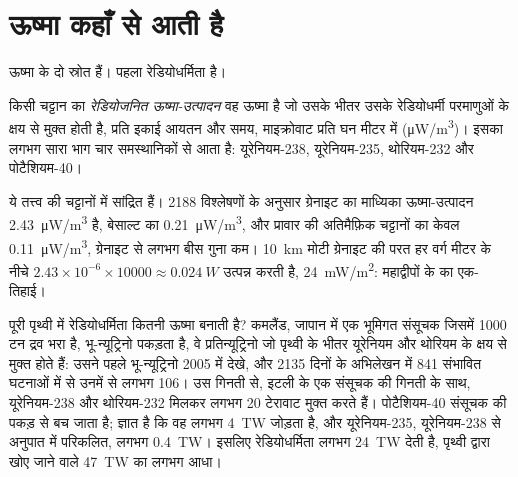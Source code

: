 \section{ऊष्मा कहाँ से आती है}

ऊष्मा के दो स्रोत हैं। पहला रेडियोधर्मिता है।

\begin{definition}[रेडियोजनित ऊष्मा-उत्पादन]\label{def:g12:internal-heat:heat-production}
किसी चट्टान का \emph{रेडियोजनित ऊष्मा-उत्पादन}
वह ऊष्मा है जो उसके भीतर उसके रेडियोधर्मी परमाणुओं के क्षय से मुक्त होती है,
प्रति इकाई आयतन और समय, माइक्रोवाट प्रति घन मीटर में
(\unit{\micro W/m^3})। इसका लगभग सारा भाग चार समस्थानिकों से आता है: यूरेनियम-238,
यूरेनियम-235, थोरियम-232 और पोटैशियम-40।
\end{definition}

ये तत्त्व  की चट्टानों में सांद्रित हैं।
2188 विश्लेषणों के अनुसार ग्रेनाइट का माध्यिका ऊष्मा-उत्पादन
\qty{2.43}{\micro W/m^3} है, बेसाल्ट का \qty{0.21}{\micro W/m^3}, और
प्रावार की अतिमैफ़िक चट्टानों का केवल \qty{0.11}{\micro W/m^3}, ग्रेनाइट से लगभग बीस
गुना कम। \qty{10}{km} मोटी ग्रेनाइट की परत हर वर्ग मीटर के नीचे
$2.43 \times 10^{-6} \times \num{10000} \approx \qty{0.024}{W}$ उत्पन्न करती है,
\qty{24}{mW/m^2}: महाद्वीपों के  का एक-तिहाई।

पूरी पृथ्वी में रेडियोधर्मिता कितनी ऊष्मा बनाती है? कमलैंड, जापान में एक
भूमिगत संसूचक जिसमें 1000 टन द्रव भरा है, भू-न्यूट्रिनो पकड़ता है,
वे प्रतिन्यूट्रिनो जो पृथ्वी के भीतर यूरेनियम और थोरियम के क्षय से मुक्त होते हैं:
उसने पहले भू-न्यूट्रिनो 2005 में देखे, और 2135 दिनों के
अभिलेखन में 841 संभावित घटनाओं में से उनमें से लगभग 106। उस गिनती से,
इटली के एक संसूचक की गिनती के साथ, यूरेनियम-238 और थोरियम-232 मिलकर
लगभग 20 टेरावाट मुक्त करते हैं। पोटैशियम-40 संसूचक की पकड़ से बच जाता है; ज्ञात है कि वह
लगभग \qty{4}{TW} जोड़ता है, और यूरेनियम-235, यूरेनियम-238 से अनुपात में परिकलित, लगभग
\qty{0.4}{TW}। इसलिए रेडियोधर्मिता लगभग \qty{24}{TW} देती है,
पृथ्वी द्वारा खोए जाने वाले \qty{47}{TW} का लगभग आधा।

